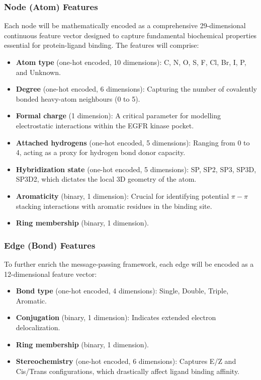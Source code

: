 \subsubsection{Node (Atom) Features}
Each node will be mathematically encoded as a comprehensive 29-dimensional continuous feature vector designed to capture fundamental biochemical properties essential for protein-ligand binding. The features will comprise:
\begin{itemize}
    \item \textbf{Atom type} (one-hot encoded, 10 dimensions): C, N, O, S, F, Cl, Br, I, P, and Unknown.
    \item \textbf{Degree} (one-hot encoded, 6 dimensions): Capturing the number of covalently bonded heavy-atom neighbours (0 to 5).
    \item \textbf{Formal charge} (1 dimension): A critical parameter for modelling electrostatic interactions within the EGFR kinase pocket.
    \item \textbf{Attached hydrogens} (one-hot encoded, 5 dimensions): Ranging from 0 to 4, acting as a proxy for hydrogen bond donor capacity.
    \item \textbf{Hybridization state} (one-hot encoded, 5 dimensions): SP, SP2, SP3, SP3D, SP3D2, which dictates the local 3D geometry of the atom.
    \item \textbf{Aromaticity} (binary, 1 dimension): Crucial for identifying potential $\pi-\pi$ stacking interactions with aromatic residues in the binding site.
    \item \textbf{Ring membership} (binary, 1 dimension).
\end{itemize}

\subsubsection{Edge (Bond) Features}
To further enrich the message-passing framework, each edge will be encoded as a 12-dimensional feature vector:
\begin{itemize}
    \item \textbf{Bond type} (one-hot encoded, 4 dimensions): Single, Double, Triple, Aromatic.
    \item \textbf{Conjugation} (binary, 1 dimension): Indicates extended electron delocalization.
    \item \textbf{Ring membership} (binary, 1 dimension).
    \item \textbf{Stereochemistry} (one-hot encoded, 6 dimensions): Captures E/Z and Cis/Trans configurations, which drastically affect ligand binding affinity.
\end{itemize}

